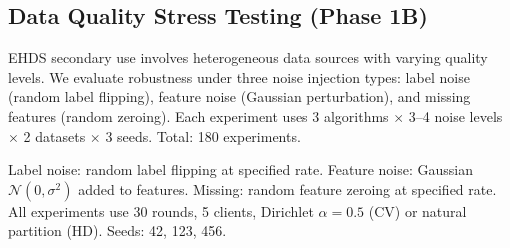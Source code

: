 \documentclass[conference]{IEEEtran}
\begin{document}
\subsection{Data Quality Stress Testing (Phase 1B)}
\label{sec:data_quality_stress}

EHDS secondary use involves heterogeneous data sources with varying quality levels. We evaluate robustness under three noise injection types: label noise (random label flipping), feature noise (Gaussian perturbation), and missing features (random zeroing). Each experiment uses 3 algorithms $\times$ 3--4 noise levels $\times$ 2 datasets $\times$ 3 seeds. Total: 180 experiments.

\begin{table}[htbp]
\centering
\caption{Data Quality Stress: Best Accuracy (\%) Under Noise Injection (Mean over 3 Seeds)}
\label{tab:data_quality_stress}
\par{\footnotesize Label noise: random label flipping at specified rate. Feature noise: Gaussian $\mathcal{N}(0, \sigma^2)$ added to features. Missing: random feature zeroing at specified rate. All experiments use 30 rounds, 5 clients, Dirichlet $\alpha{=}0.5$ (CV) or natural partition (HD). Seeds: 42, 123, 456.}
\end{table}
\end{document}
